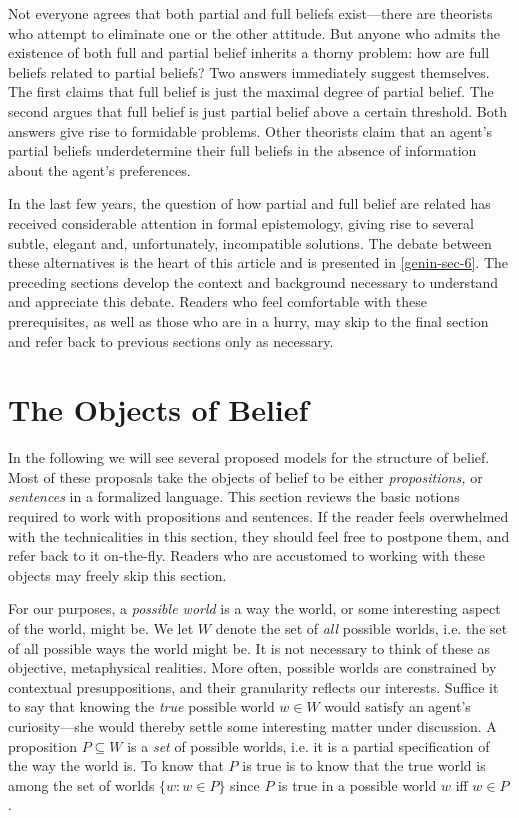 Not everyone agrees that both partial and full beliefs exist---there are
theorists who attempt to eliminate one or the other attitude. But anyone who
admits the existence of both full and partial belief inherits a thorny problem:
how are full beliefs related to partial beliefs? Two  answers immediately
suggest themselves. The first claims that full belief is just the maximal degree
of partial belief. The second argues that full belief is just partial belief
above a certain threshold. Both answers give rise to formidable problems. Other
theorists claim that an agent's partial beliefs underdetermine their full
beliefs in the absence of information about the agent's preferences.

In the last few years, the question of how partial and full belief are related
has received considerable attention in formal epistemology, giving rise to
several subtle, elegant and, unfortunately, incompatible solutions. The debate
between these alternatives is the heart of this article and is presented in
\autoref{genin-sec-6}. The preceding sections develop the context and background
necessary to understand and appreciate this debate. Readers who feel comfortable
with these prerequisites, as well as those who are in a hurry, may skip to the
final section and refer back to previous sections only as necessary.

\section{The Objects of Belief} \label{objects}
In the following we will see several proposed models for the structure of
belief. Most of these proposals take the objects of belief to be either {\em
propositions,} or {\em sentences} in a formalized language. This section reviews
the basic notions required to work with propositions and sentences. If the
reader feels overwhelmed with the technicalities in this section, they should
feel free to postpone them, and refer back to it on-the-fly. Readers who are
accustomed to working with these objects may freely skip this section.

For our purposes, a {\em possible world} is a way the world, or some interesting
aspect of the world, might be. We let $W$ denote the set of {\em all} possible
worlds, i.e. the set of all possible ways the world might be. It is not
necessary to think of these as objective, metaphysical realities. More often,
possible worlds are constrained by contextual presuppositions, and their
granularity reflects our interests. Suffice it to say that knowing the {\em
true} possible world $w\in W$ would satisfy an agent's curiosity---she would
thereby settle some interesting matter under discussion. A proposition
$P\subseteq W$ is a {\em set} of possible worlds, i.e. it is a partial
specification of the way the world is. To know that $P$ is true is to know that
the true world is among the set of worlds $\{ w : w \in P \}$ since $P$ is true
in a possible world $w$ iff $w\in P$.

